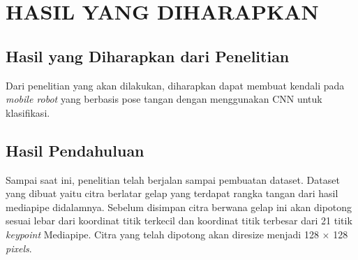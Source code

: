 \section{HASIL YANG DIHARAPKAN}

\subsection{Hasil yang Diharapkan dari Penelitian}

Dari penelitian yang akan dilakukan, diharapkan dapat membuat kendali pada \textit{mobile robot} yang berbasis pose tangan dengan menggunakan CNN untuk klasifikasi.

\subsection{Hasil Pendahuluan}
Sampai saat ini, penelitian telah berjalan sampai pembuatan dataset. Dataset yang dibuat yaitu citra berlatar gelap yang terdapat rangka tangan dari hasil mediapipe didalamnya. Sebelum disimpan citra berwana gelap ini akan dipotong sesuai lebar dari koordinat titik terkecil dan koordinat titik terbesar dari 21 titik \textit{keypoint} Mediapipe. Citra yang telah dipotong akan diresize menjadi 128 $\times$ 128 \textit{pixels}.
